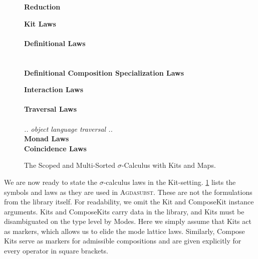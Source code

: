 \documentclass[screen,nonacm]{acmart}
\begin{document}
\begin{figure}[tp]
      {\raggedright \vspace{2.0em} \textbf{\Large Reduction} \par}
      \vspace{1.5em}
      \begin{minipage}[t]{0.40\textwidth}
            \raggedright
            \textbf{Kit Laws}\\
            \ETypeLevel{}\\
            \vspace{0.5em}
            \textbf{Definitional Laws}\\
            \vspace{0.5em}
            \EDefLawTy{}\\
            \vspace{0.5em}
            \EDefLaw{}\\
            \vspace{0.5em}
            \textbf{Definitional Composition Specialization Laws}
            \ESpecialDefLaws{}
      \end{minipage}
      \hfill
      \begin{minipage}[t]{0.54\textwidth}
            \raggedright
            \textbf{Interaction Laws}\\
            \EInteraction{}\\
            \vspace{0.5em}
            \textbf{Traversal Laws}\\
            \ETravL{}\\
            \emph{.. object language traversal ..}\\
            \vspace{0.5em}
            \textbf{Monad Laws}\\
            \EMonad{}
            \vspace{0.5em}
            \textbf{Coincidence Laws}\\
            \ECoincidence{}
      \end{minipage}
      \caption{The Scoped and Multi-Sorted $\sigma$-Calculus with Kits and Maps.}
      \label{fig:ags-fin}
\end{figure}

We are now ready to state the $\sigma$-calculus laws in the Kit-setting.
\cref{fig:ags-fin} lists the symbols and laws as they are used in
\textsc{Agdasubst}. These are not the formulations from the library itself. For
readability, we omit the Kit and ComposeKit instance arguments. Kits and
ComposeKits carry data in the library, and Kits must be disambiguated on the
type level by Modes. Here we simply assume that Kits act as markers, which
allows us to elide the mode lattice laws. Similarly, Compose Kits serve as
markers for admissible compositions and are given explicitly for every operator
in square brackets.
\end{document}
